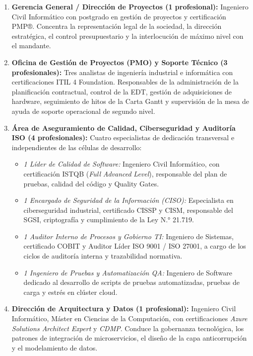 \begin{enumerate}
  \item \textbf{Gerencia General / Dirección de Proyectos (1 profesional):} Ingeniero Civil Informático con postgrado en gestión de proyectos y certificación PMP®. Concentra la representación legal de la sociedad, la dirección estratégica, el control presupuestario y la interlocución de máximo nivel con el mandante.
  \item \textbf{Oficina de Gestión de Proyectos (PMO) y Soporte Técnico (3 profesionales):} Tres analistas de ingeniería industrial e informática con certificaciones ITIL 4 Foundation. Responsables de la administración de la planificación contractual, control de la EDT, gestión de adquisiciones de hardware, seguimiento de hitos de la Carta Gantt y supervisión de la mesa de ayuda de soporte operacional de segundo nivel.
  \item \textbf{Área de Aseguramiento de Calidad, Ciberseguridad y Auditoría ISO (4 profesionales):} Cuatro especialistas de dedicación transversal e independientes de las células de desarrollo:
  \begin{itemize}
    \item \textit{1 Líder de Calidad de Software:} Ingeniero Civil Informático, con certificación ISTQB (\textit{Full} \textit{Advanced} \textit{Level}), responsable del plan de pruebas, calidad del código y Quality Gates.
    \item \textit{1 Encargado de Seguridad de la Información (CISO):} Especialista en ciberseguridad industrial, certificado CISSP y CISM, responsable del SGSI, criptografía y cumplimiento de la Ley N.° 21.719.
    \item \textit{1 Auditor Interno de Procesos y Gobierno TI:} Ingeniero de Sistemas, certificado COBIT y Auditor Líder ISO 9001 / ISO 27001, a cargo de los ciclos de auditoría interna y trazabilidad normativa.
    \item \textit{1 Ingeniero de Pruebas y Automatización QA:} Ingeniero de Software dedicado al desarrollo de scripts de pruebas automatizadas, pruebas de carga y estrés en clúster cloud.
  \end{itemize}
  \item \textbf{Dirección de Arquitectura y Datos (1 profesional):} Ingeniero Civil Informático, Máster en Ciencias de la Computación, con certificaciones \textit{Azure Solutions Architect Expert} y \textit{CDMP}. Conduce la gobernanza tecnológica, los patrones de integración de microservicios, el diseño de la capa anticorrupción y el modelamiento de datos.

\end{enumerate}
